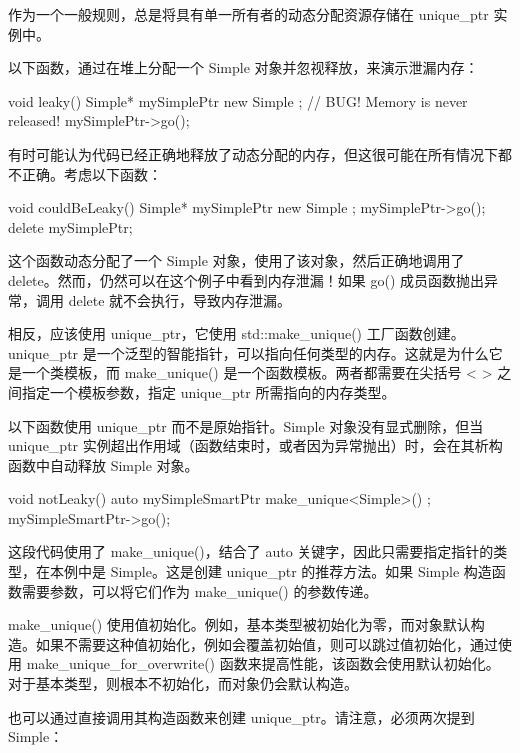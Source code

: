 作为一个一般规则，总是将具有单一所有者的动态分配资源存储在 unique\_ptr 实例中。


以下函数，通过在堆上分配一个 Simple 对象并忽视释放，来演示泄漏内存：

\begin{cpp}
void leaky()
{
    Simple* mySimplePtr { new Simple{} }; // BUG! Memory is never released!
    mySimplePtr->go();
}
\end{cpp}

有时可能认为代码已经正确地释放了动态分配的内存，但这很可能在所有情况下都不正确。考虑以下函数：

\begin{cpp}
void couldBeLeaky()
{
    Simple* mySimplePtr { new Simple{} };
    mySimplePtr->go();
    delete mySimplePtr;
}
\end{cpp}

这个函数动态分配了一个 Simple 对象，使用了该对象，然后正确地调用了 delete。然而，仍然可以在这个例子中看到内存泄漏！如果 go() 成员函数抛出异常，调用 delete 就不会执行，导致内存泄漏。

相反，应该使用 unique\_ptr，它使用 std::make\_unique() 工厂函数创建。unique\_ptr 是一个泛型的智能指针，可以指向任何类型的内存。这就是为什么它是一个类模板，而 make\_unique() 是一个函数模板。两者都需要在尖括号 < > 之间指定一个模板参数，指定 unique\_ptr 所需指向的内存类型。

以下函数使用 unique\_ptr 而不是原始指针。Simple 对象没有显式删除，但当 unique\_ptr 实例超出作用域（函数结束时，或者因为异常抛出）时，会在其析构函数中自动释放 Simple 对象。

\begin{cpp}
void notLeaky()
{
    auto mySimpleSmartPtr { make_unique<Simple>() };
    mySimpleSmartPtr->go();
}
\end{cpp}

这段代码使用了 make\_unique()，结合了 auto 关键字，因此只需要指定指针的类型，在本例中是 Simple。这是创建 unique\_ptr 的推荐方法。如果 Simple 构造函数需要参数，可以将它们作为 make\_unique() 的参数传递。

make\_unique() 使用值初始化。例如，基本类型被初始化为零，而对象默认构造。如果不需要这种值初始化，例如会覆盖初始值，则可以跳过值初始化，通过使用 make\_unique\_for\_overwrite() 函数来提高性能，该函数会使用默认初始化。对于基本类型，则根本不初始化，而对象仍会默认构造。

也可以通过直接调用其构造函数来创建 unique\_ptr。请注意，必须两次提到 Simple：

